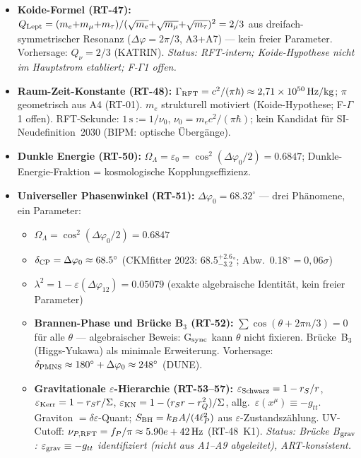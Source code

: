 \documentclass[12pt]{iopart}
\begin{document}
	\begin{itemize}
		\item \textbf{Koide-Formel (RT-47):}
		$Q_{\rm Lept} = (m_e{+}m_\mu{+}m_\tau)/(\sqrt{m_e}{+}\sqrt{m_\mu}{+}\sqrt{m_\tau})^2 = 2/3$
		aus dreifach-symmetrischer Resonanz ($\Delta\varphi=2\pi/3$, A3+A7) ---
		kein freier Parameter. Vorhersage: $Q_\nu = 2/3$ (KATRIN).
		\textit{Status: RFT-intern; Koide-Hypothese nicht im Hauptstrom etabliert; F-$\Gamma$1 offen.}
		
		\item \textbf{Raum-Zeit-Konstante (RT-48):}
		$\Gamma_{\rm RFT} = c^2/(\pi\hbar) \approx 2{,}71\times10^{50}\,{\rm Hz/kg}$;
		$\pi$ geometrisch aus A4 (RT-01). $m_e$ strukturell motiviert (Koide-Hypothese;
		F-$\Gamma$1 offen). RFT-Sekunde: $1\,\mathrm{s} := 1/\nu_0$, $\nu_0=m_e c^2/(\pi\hbar)$;
		kein Kandidat f\"ur SI-Neudefinition~2030 (BIPM: optische \"Uberg\"ange).
		
		\item \textbf{Dunkle Energie (RT-50):}
		$\Omega_\Lambda = \varepsilon_0 = \cos^2(\Delta\varphi_0/2) = 0.6847$;
		Dunkle-Energie-Fraktion = kosmologische Kopplungseffizienz.
		
		\item \textbf{Universeller Phasenwinkel (RT-51):}
		$\Delta\varphi_0 = 68.32^\circ$ --- drei Ph\"anomene, ein Parameter:
		\begin{itemize}
			\item $\Omega_\Lambda = \cos^2(\Delta\varphi_0/2) = 0.6847$
			\item $\delta_{\rm CP} = \Delta\varphi_0 \approx 68.5^\circ$
			(CKMfitter 2023: $68.5^{+2.6}_{-3.2}{}^\circ$; Abw.\ 0.18$^\circ = 0{,}06\sigma$)
			\item $\lambda^2 = 1 - \varepsilon(\Delta\varphi_{12}) = 0.05079$
			(exakte algebraische Identit\"at, kein freier Parameter)

		\item \textbf{Brannen-Phase und Br\"ucke B$_3$ (RT-52):}
		$\sum\cos(\theta + 2\pi n/3) = 0$ f\"ur alle $\theta$ --- algebraischer
		Beweis: G$_{\rm sync}$ kann $\theta$ nicht fixieren. Br\"ucke~B$_3$
		(Higgs-Yukawa) als minimale Erweiterung. Vorhersage:
		$\delta_{\rm PMNS} \approx 180^\circ + \Delta\varphi_0 \approx 248^\circ$ (DUNE).

		\item \textbf{Gravitationale $\varepsilon$-Hierarchie (RT-53--57):}
		$\varepsilon_{\rm Schwarz}=1-r_S/r$,
		$\varepsilon_{\rm Kerr}=1-r_Sr/\Sigma$,
		$\varepsilon_{\rm KN}=1-(r_Sr-r_Q^2)/\Sigma$,
		allg.\ $\varepsilon(x^\mu)\equiv-g_{tt}$.
		Graviton $= \delta\hat\varepsilon$-Quant;
		$S_{\rm BH} = k_B A/(4\ell_P^2)$ aus $\varepsilon$-Zustandsz\"ahlung.
		UV-Cutoff: $\nu_{P,{\rm RFT}} = f_P/\pi \approx 5.90e+42\,{\rm Hz}$ (RT-48~K1).
		\textit{Status: Br\"ucke B$_{\rm grav}$: $\varepsilon_{\rm grav}\equiv-g_{tt}$
		identifiziert (nicht aus A1--A9 abgeleitet), ART-konsistent.}


\end{itemize}
\end{itemize}
\end{document}
